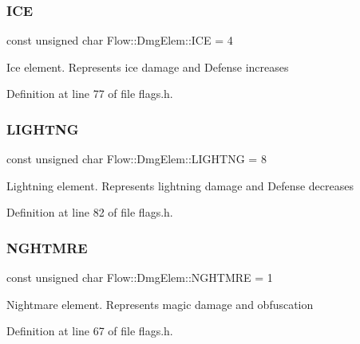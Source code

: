 \hypertarget{namespace_flow_1_1_dmg_elem_a30739bfaff89a78947afa83acd27fc16}{}\label{namespace_flow_1_1_dmg_elem_a30739bfaff89a78947afa83acd27fc16} 
\subsubsection{\texorpdfstring{I\+CE}{ICE}}
{\footnotesize\ttfamily const unsigned char Flow\+::\+Dmg\+Elem\+::\+I\+CE = 4}

Ice element. Represents ice damage and Defense increases 

Definition at line 77 of file flags.\+h.

\hypertarget{namespace_flow_1_1_dmg_elem_ae77f57817a01c597933d72de6f00df36}{}\label{namespace_flow_1_1_dmg_elem_ae77f57817a01c597933d72de6f00df36} 
\subsubsection{\texorpdfstring{L\+I\+G\+H\+T\+NG}{LIGHTNG}}
{\footnotesize\ttfamily const unsigned char Flow\+::\+Dmg\+Elem\+::\+L\+I\+G\+H\+T\+NG = 8}

Lightning element. Represents lightning damage and Defense decreases 

Definition at line 82 of file flags.\+h.

\hypertarget{namespace_flow_1_1_dmg_elem_ab1e9e2aae5dd0691b09de8ade59d3984}{}\label{namespace_flow_1_1_dmg_elem_ab1e9e2aae5dd0691b09de8ade59d3984} 
\subsubsection{\texorpdfstring{N\+G\+H\+T\+M\+RE}{NGHTMRE}}
{\footnotesize\ttfamily const unsigned char Flow\+::\+Dmg\+Elem\+::\+N\+G\+H\+T\+M\+RE = 1}

Nightmare element. Represents magic damage and obfuscation 

Definition at line 67 of file flags.\+h.

\hypertarget{namespace_flow_1_1_dmg_elem_a2c7180f371963927ddcc5b333568a33b}{}\label{namespace_flow_1_1_dmg_elem_a2c7180f371963927ddcc5b333568a33b} 

